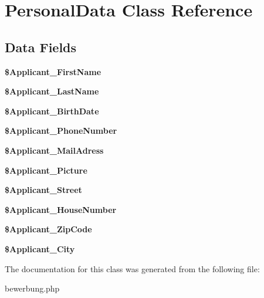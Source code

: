 \hypertarget{class_personal_data}{\section{Personal\-Data Class Reference}
\label{class_personal_data}
}
\subsection*{Data Fields}
\begin{DoxyCompactItemize}
\item 
\hypertarget{class_personal_data_a5c8472439eb8494f3e0824b54bb93a0b}{{\bfseries \$\-Applicant\-\_\-\-First\-Name}}\label{class_personal_data_a5c8472439eb8494f3e0824b54bb93a0b}

\item 
\hypertarget{class_personal_data_a44b6ab9c34c4e1f0229df96fc40e484d}{{\bfseries \$\-Applicant\-\_\-\-Last\-Name}}\label{class_personal_data_a44b6ab9c34c4e1f0229df96fc40e484d}

\item 
\hypertarget{class_personal_data_a06562cac7b0718091bb57284a4dd277c}{{\bfseries \$\-Applicant\-\_\-\-Birth\-Date}}\label{class_personal_data_a06562cac7b0718091bb57284a4dd277c}

\item 
\hypertarget{class_personal_data_a77ed2f2d15e0d52fcd176143191e3dfd}{{\bfseries \$\-Applicant\-\_\-\-Phone\-Number}}\label{class_personal_data_a77ed2f2d15e0d52fcd176143191e3dfd}

\item 
\hypertarget{class_personal_data_a7002f30b585e0da69f5d77c778c5faf2}{{\bfseries \$\-Applicant\-\_\-\-Mail\-Adress}}\label{class_personal_data_a7002f30b585e0da69f5d77c778c5faf2}

\item 
\hypertarget{class_personal_data_a846d6a75b1b8028f2dbac8fe16f86db4}{{\bfseries \$\-Applicant\-\_\-\-Picture}}\label{class_personal_data_a846d6a75b1b8028f2dbac8fe16f86db4}

\item 
\hypertarget{class_personal_data_a9364f116693923fe27da2a1e0058e36a}{{\bfseries \$\-Applicant\-\_\-\-Street}}\label{class_personal_data_a9364f116693923fe27da2a1e0058e36a}

\item 
\hypertarget{class_personal_data_a27354e5988352fa85bf5fc71c908ce7a}{{\bfseries \$\-Applicant\-\_\-\-House\-Number}}\label{class_personal_data_a27354e5988352fa85bf5fc71c908ce7a}

\item 
\hypertarget{class_personal_data_a019c62c871aea50ea421862ea6eaed53}{{\bfseries \$\-Applicant\-\_\-\-Zip\-Code}}\label{class_personal_data_a019c62c871aea50ea421862ea6eaed53}

\item 
\hypertarget{class_personal_data_a91cab84f80cc5ed041160aa2400cc2aa}{{\bfseries \$\-Applicant\-\_\-\-City}}\label{class_personal_data_a91cab84f80cc5ed041160aa2400cc2aa}

\end{DoxyCompactItemize}


The documentation for this class was generated from the following file\-:\begin{DoxyCompactItemize}
\item 
bewerbung.\-php\end{DoxyCompactItemize}
